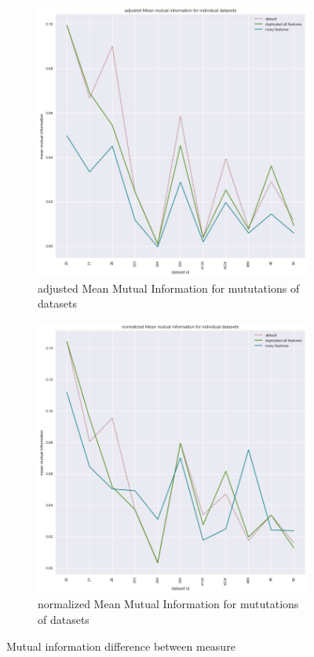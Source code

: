 \documentclass[a4paper,10pt]{article}
\begin{document}
\begin{figure}[H]
\begin{subfigure}[b]{0.45\textwidth}
		\includegraphics[width=\textwidth]{images/adjustedMeanMutualInformation.png}
		\caption{adjusted Mean Mutual Information for mututations of datasets}
		\label{fig:AMMI}
	\end{subfigure}
	\begin{subfigure}[b]{0.45\textwidth}
		\includegraphics[width=\textwidth]{images/normalizedMeanMutualInformation.png}
		\caption{normalized Mean Mutual Information for mututations of datasets}
		\label{fig:NMMI}
	\end{subfigure}
	\caption{Mutual information difference between measure}\label{fig:MMIs}
\end{figure}
\end{document}
